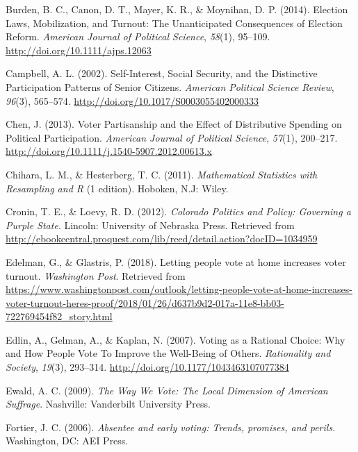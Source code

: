 \documentclass[12pt,twoside]{reedthesis}
\begin{document}
  \hypertarget{ref-burden_election_2014}{}
  Burden, B. C., Canon, D. T., Mayer, K. R., \& Moynihan, D. P. (2014).
  Election Laws, Mobilization, and Turnout: The Unanticipated Consequences
  of Election Reform. \emph{American Journal of Political Science},
  \emph{58}(1), 95--109. \url{http://doi.org/10.1111/ajps.12063}
  
  \hypertarget{ref-campbell_self-interest_2002}{}
  Campbell, A. L. (2002). Self-Interest, Social Security, and the
  Distinctive Participation Patterns of Senior Citizens. \emph{American
  Political Science Review}, \emph{96}(3), 565--574.
  \url{http://doi.org/10.1017/S0003055402000333}
  
  \hypertarget{ref-chen_voter_2013}{}
  Chen, J. (2013). Voter Partisanship and the Effect of Distributive
  Spending on Political Participation. \emph{American Journal of Political
  Science}, \emph{57}(1), 200--217.
  \url{http://doi.org/10.1111/j.1540-5907.2012.00613.x}
  
  \hypertarget{ref-chihara_mathematical_2011}{}
  Chihara, L. M., \& Hesterberg, T. C. (2011). \emph{Mathematical
  Statistics with Resampling and R} (1 edition). Hoboken, N.J: Wiley.
  
  \hypertarget{ref-cronin_colorado_2012}{}
  Cronin, T. E., \& Loevy, R. D. (2012). \emph{Colorado Politics and
  Policy: Governing a Purple State}. Lincoln: University of Nebraska
  Press. Retrieved from
  \url{http://ebookcentral.proquest.com/lib/reed/detail.action?docID=1034959}
  
  \hypertarget{ref-edelman_letting_2018}{}
  Edelman, G., \& Glastris, P. (2018). Letting people vote at home
  increases voter turnout. \emph{Washington Post}. Retrieved from
  \url{https://www.washingtonpost.com/outlook/letting-people-vote-at-home-increases-voter-turnout-heres-proof/2018/01/26/d637b9d2-017a-11e8-bb03-722769454f82_story.html}
  
  \hypertarget{ref-edlin_voting_2007}{}
  Edlin, A., Gelman, A., \& Kaplan, N. (2007). Voting as a Rational
  Choice: Why and How People Vote To Improve the Well-Being of Others.
  \emph{Rationality and Society}, \emph{19}(3), 293--314.
  \url{http://doi.org/10.1177/1043463107077384}
  
  \hypertarget{ref-ewald_way_2009}{}
  Ewald, A. C. (2009). \emph{The Way We Vote: The Local Dimension of
  American Suffrage}. Nashville: Vanderbilt University Press.
  
  \hypertarget{ref-fortier_absentee_2006}{}
  Fortier, J. C. (2006). \emph{Absentee and early voting: Trends,
  promises, and perils}. Washington, DC: AEI Press.
  
\end{document}
